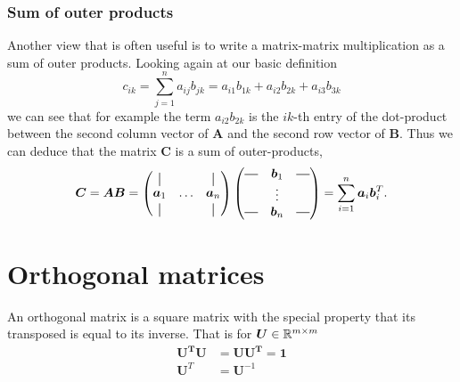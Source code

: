 \subsubsection{Sum of outer products}
Another view that is often useful is to 
write a matrix-matrix multiplication as a sum of outer products.
Looking again at our basic definition
\begin{equation}
    c_{ik} = \sum_{j=1}^n a_{ij} b_{jk} = a_{i1} b_{1k} + a_{i2} b_{2k} + a_{i3} b_{3k}
\end{equation}
we can see that for example the term $a_{i2} b_{2k}$ is the $ik$-th entry of the dot-product between
the second column vector of $\bm{A}$ and the second row vector of $\bm{B}$.
Thus we can deduce that the matrix $\bm{C}$ is a sum of outer-products,
\begin{equation}
    \bm{C} = \bm{AB} = \begin{pmatrix}
    \vertbar &        & \vertbar \\
    \bm{a}_1 & \hdots & \bm{a}_n \\
    \vertbar &        & \vertbar 
    \end{pmatrix}
    \begin{pmatrix}
        \horzbar & \bm{b}_1 & \horzbar \\
                  & \vdots   &  \\
        \horzbar & \bm{b}_n &  \horzbar \\
    \end{pmatrix}  = 
    \sum_{i=1}^n \bm{a}_i \bm{b}_i^T.
\end{equation}

\section{Orthogonal matrices}

An orthogonal matrix is a square matrix with the special property that its transposed is equal to its inverse.
That is for $\bm{U} \in \mathbb{R}^{m \times m}$
\begin{align}
    \bm{U^T} \bm{U} &= \bm{U} \bm{U^T} = \bm{1} \\
    \bm{U}^T &= \bm{U}^{-1}
\end{align}

